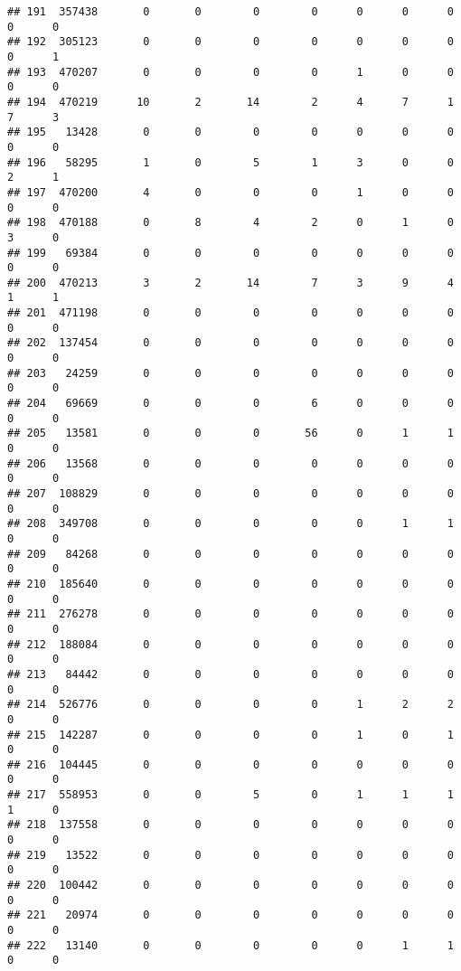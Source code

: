 \documentclass[
]{article}
\begin{document}
\begin{verbatim}
## 191  357438       0       0        0        0      0      0      0     0      0
## 192  305123       0       0        0        0      0      0      0     0      1
## 193  470207       0       0        0        0      1      0      0     0      0
## 194  470219      10       2       14        2      4      7      1     7      3
## 195   13428       0       0        0        0      0      0      0     0      0
## 196   58295       1       0        5        1      3      0      0     2      1
## 197  470200       4       0        0        0      1      0      0     0      0
## 198  470188       0       8        4        2      0      1      0     3      0
## 199   69384       0       0        0        0      0      0      0     0      0
## 200  470213       3       2       14        7      3      9      4     1      1
## 201  471198       0       0        0        0      0      0      0     0      0
## 202  137454       0       0        0        0      0      0      0     0      0
## 203   24259       0       0        0        0      0      0      0     0      0
## 204   69669       0       0        0        6      0      0      0     0      0
## 205   13581       0       0        0       56      0      1      1     0      0
## 206   13568       0       0        0        0      0      0      0     0      0
## 207  108829       0       0        0        0      0      0      0     0      0
## 208  349708       0       0        0        0      0      1      1     0      0
## 209   84268       0       0        0        0      0      0      0     0      0
## 210  185640       0       0        0        0      0      0      0     0      0
## 211  276278       0       0        0        0      0      0      0     0      0
## 212  188084       0       0        0        0      0      0      0     0      0
## 213   84442       0       0        0        0      0      0      0     0      0
## 214  526776       0       0        0        0      1      2      2     0      0
## 215  142287       0       0        0        0      1      0      1     0      0
## 216  104445       0       0        0        0      0      0      0     0      0
## 217  558953       0       0        5        0      1      1      1     1      0
## 218  137558       0       0        0        0      0      0      0     0      0
## 219   13522       0       0        0        0      0      0      0     0      0
## 220  100442       0       0        0        0      0      0      0     0      0
## 221   20974       0       0        0        0      0      0      0     0      0
## 222   13140       0       0        0        0      0      1      1     0      0

\end{verbatim}
\end{document}
